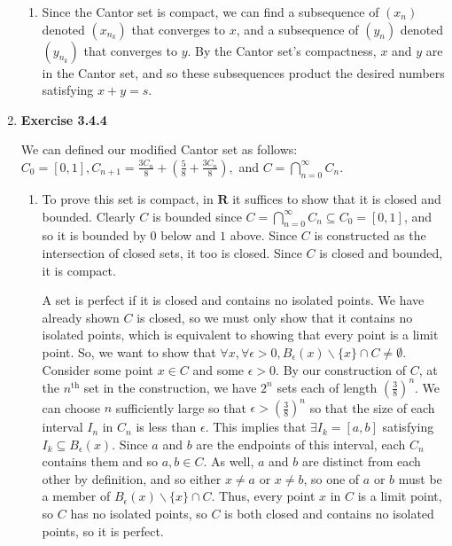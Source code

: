 \documentclass{article}
\begin{document}
\begin{enumerate}
\begin{enumerate}
        \item Since the Cantor set is compact, we can find a subsequence of $(x_n)$ denoted $(x_{n_k})$ that converges to $x$, and a subsequence of $(y_n)$ denoted $(y_{n_k})$ that converges to $y$. By the Cantor set's compactness, $x$ and $y$ are in the Cantor set, and so these subsequences product the desired numbers satisfying $x + y = s$. 
    \end{enumerate}

    \item \textbf{Exercise 3.4.4}

    We can defined our modified Cantor set as follows: $C_0 = [0, 1], C_{n+1} = \frac{3C_n}{8} + \left(\frac{5}{8} + \frac{3C_n}{8}\right),$ and $C = \bigcap_{n=0}^\infty C_n$.

    \begin{enumerate}
        \item To prove this set is compact, in $\mathbf{R}$ it suffices to show that it is closed and bounded. Clearly $C$ is bounded since $C = \bigcap_{n=0}^\infty C_n \subseteq C_0 = [0, 1]$, and so it is bounded by $0$ below and $1$ above. Since $C$ is constructed as the intersection of closed sets, it too is closed. Since $C$ is closed and bounded, it is compact. 

        \smallskip

        A set is perfect if it is closed and contains no isolated points. We have already shown $C$ is closed, so we must only show that it contains no isolated points, which is equivalent to showing that every point is a limit point. So, we want to show that $\forall x, \forall \epsilon > 0, B_\epsilon(x) \backslash \{x\} \cap C \neq \emptyset$. Consider some point $x \in C$ and some $\epsilon > 0$. By our construction of $C$, at the $n^\text{th}$ set in the construction, we have $2^n$ sets each of length $\left(\frac{3}{8}\right)^n$. We can choose $n$ sufficiently large so that $\epsilon > \left(\frac{3}{8}\right)^n$ so that the size of each interval $I_n$ in $C_n$ is less than $\epsilon$. This implies that $\exists I_k = [a, b]$ satisfying $I_k \subseteq B_\epsilon(x)$. Since $a$ and $b$ are the endpoints of this interval, each $C_n$ contains them and so $a, b \in C$. As well, $a$ and $b$ are distinct from each other by definition, and so either $x \neq a$ or $x \neq b$, so one of $a$ or $b$ must be a member of $B_\epsilon(x) \backslash \{x\} \cap C$. Thus, every point $x$ in $C$ is a limit point, so $C$ has no isolated points, so $C$ is both closed and contains no isolated points, so it is perfect.


\end{enumerate}
\end{enumerate}
\end{document}

